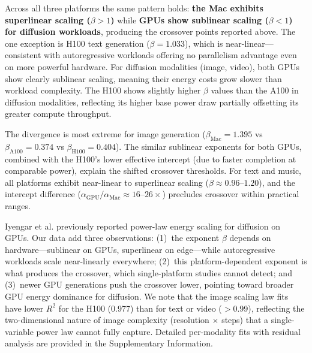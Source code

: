 \documentclass[11pt]{article}
\begin{document}
Across all three platforms the same pattern holds: \textbf{the Mac exhibits superlinear scaling ($\beta > 1$)} while \textbf{GPUs show sublinear scaling ($\beta < 1$) for diffusion workloads}, producing the crossover points reported above. The one exception is H100 text generation ($\beta = 1.033$), which is near-linear---consistent with autoregressive workloads offering no parallelism advantage even on more powerful hardware. For diffusion modalities (image, video), both GPUs show clearly sublinear scaling, meaning their energy costs grow slower than workload complexity. The H100 shows slightly higher $\beta$ values than the A100 in diffusion modalities, reflecting its higher base power draw partially offsetting its greater compute throughput.

The divergence is most extreme for image generation ($\beta_\text{Mac} = 1.395$ vs $\beta_\text{A100} = 0.374$ vs $\beta_\text{H100} = 0.404$). The similar sublinear exponents for both GPUs, combined with the H100's lower effective intercept (due to faster completion at comparable power), explain the shifted crossover thresholds. For text and music, all platforms exhibit near-linear to superlinear scaling ($\beta \approx 0.96$--$1.20$), and the intercept difference ($\alpha_\text{GPU} / \alpha_\text{Mac} \approx 16$--$26\times$) precludes crossover within practical ranges.

Iyengar et al.\cite{castano2025energy} previously reported power-law energy scaling for diffusion on GPUs. Our data add three observations: (1)~the exponent $\beta$ depends on hardware---sublinear on GPUs, superlinear on edge---while autoregressive workloads scale near-linearly everywhere; (2)~this platform-dependent exponent is what produces the crossover, which single-platform studies cannot detect; and (3)~newer GPU generations push the crossover lower, pointing toward broader GPU energy dominance for diffusion. We note that the image scaling law fits have lower $R^2$ for the H100 (0.977) than for text or video ($>$0.99), reflecting the two-dimensional nature of image complexity (resolution $\times$ steps) that a single-variable power law cannot fully capture. Detailed per-modality fits with residual analysis are provided in the Supplementary Information.
\end{document}
